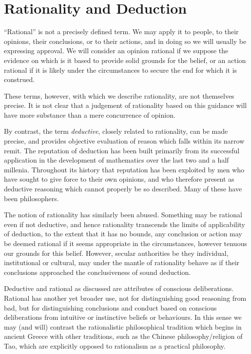 \def\rbjidchaab{$$Id: ch001.tex,v 1.2 2010/01/25 13:11:02 rbj Exp $$}
\chapter{Rationality and Deduction}\label{RationalityDeduction}

``Rational'' is not a precisely defined term.
We may apply it to people, to their opinions, their conclusions, or to their actions, and in doing so we will usually be expressing approval.
We will consider an opinion rational if we suppose the evidence on which is it based to provide solid grounds for the belief, or an action rational if it is likely under the circumstances to secure the end for which it is construed.

These terms, however, with which we describe rationality, are not themselves precise.
It is not clear that a judgement of rationality based on this guidance will have more substance than a mere concurrence of opinion.

By contrast, the term {\it deductive}, closely related to rationality, can be made precise, and provides objective evaluation of reason which falls within its narrow remit.
The reputation of deduction has been built primarily from its successful application in the development of mathematics over the last two and a half millenia.
Throughout its history that reputation has been exploited by men who have sought to give force to their own opinions, and who therefore present as deductive reasoning which cannot properly be so described.
Many of these have been philosophers.

The notion of rationality has similarly been abused.
Something may be rational even if not deductive, and hence rationality transcends the limits of applicability of deduction, to the extent that it has no bounds, any conclusion or action may be deemed rational if it seems appropriate in the circumstances, however tenuous our grounds for this belief.
However, secular authorities be they individual, institutional or cultural, may under the mantle of rationality behave as if their conclusions approached the conclusiveness of sound deduction.

Deductive and rational as discussed are attributes of conscious deliberations.
Rational has another yet broader use, not for distinguishing good reasoning from bad, but for distinguishing conclusions and conduct based on conscious deliberations from intuitive or instinctive beliefs or behaviours.
In this sense we may (and will) contrast the rationalistic philosophical tradition which begins in ancient Greece with other traditions, such as the Chinese philosophy/religion of Tao, which are explicitly opposed to rationalism as a practical philosophy.

